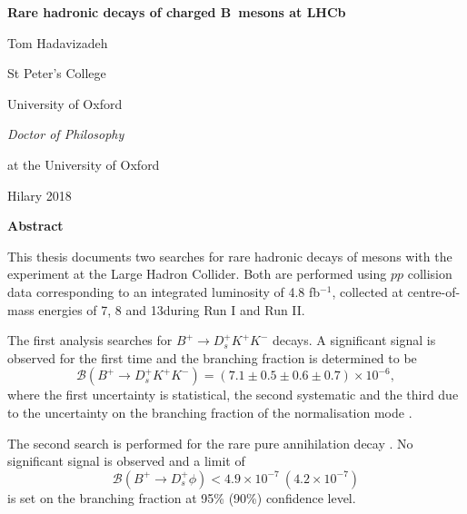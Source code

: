 

\begin{alwayssingle} 
 \thispagestyle{empty}
 \vspace*{-1in}
 \begin{center}
   { \Large {\bfseries {Rare hadronic decays of charged B~mesons at LHCb}} \par}
   {{\large \vspace*{1ex} Tom Hadavizadeh} \par}
   {\large \vspace*{1ex}
   {{St Peter's College} \par}
   {University of Oxford \par}
   \vspace*{1ex}
   {{\it \submittedtext} \par}
   {\it {Doctor of Philosophy} \par}
    \vspace*{1ex}
    {{at the University of Oxford} \par}
    \vspace*{2ex}
    {Hilary 2018}\par}
    \vspace*{1.5cm}
    {\Large \bfseries  Abstract}
  \end{center}

  This thesis documents two searches for rare hadronic decays of \Bp mesons with the \lhcb experiment at the Large Hadron Collider. 
  Both are performed using $pp$ collision data corresponding to an integrated luminosity of 4.8 fb$^{-1}$, collected at centre-of-mass energies of 7, 8 and 13\tev during Run I and Run II.
  
  The first analysis searches for $B^{+} \to D_s^{+}K^{+}K^{-}$ decays. A significant signal is observed for the first time and the branching fraction is determined to be
  \begin{equation*}
  \mathcal{B}(B^{+} \to D_s^{+}K^{+}K^{-} ) = (7.1 \pm 0.5 \pm 0.6 \pm 0.7) \times 10^{-6}, 
  \end{equation*}
  \noindent where the first uncertainty is statistical, the second systematic and the third due to the uncertainty on 
  the branching fraction of the normalisation mode \decay{\Bp}{\Dsp\Dzb}.
  
  The second search is performed for the rare pure annihilation decay \decay{\Bp}{\Dsp\phiz}.
  No significant signal is observed and a limit of
  \begin{equation*}
  \mathcal{B}(B^{+} \to D_s^{+}\phi) < 4.9 \times 10^{-7}~(4.2 \times 10^{-7})
  \end{equation*}
  is set on the branching fraction at 95\% (90\%) confidence level.



\end{alwayssingle}